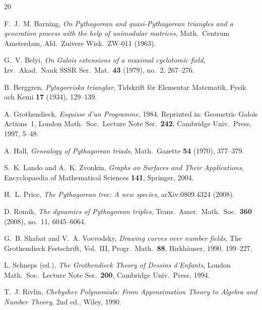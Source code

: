 \documentclass[12pt]{amsart}
\theoremstyle{definition}
\theoremstyle{remark}
\begin{document}
\begin{thebibliography}{20}

F.~J.~M. Barning,
\emph{On Pythagorean and quasi-Pythagorean triangles and a generation
process with the help of unimodular matrices},
Math.\ Centrum Amsterdam, Afd.\ Zuivere Wisk.\ ZW-011 (1963).

G.~V. Belyi,
\emph{On Galois extensions of a maximal cyclotomic field},
Izv.\ Akad.\ Nauk SSSR Ser.\ Mat.\ \textbf{43} (1979), no.~2, 267--276.

B. Berggren,
\emph{Pytagoreiska trianglar},
Tidskrift f\"or Elementar Matematik, Fysik och Kemi \textbf{17} (1934),
129--139.

A. Grothendieck,
\emph{Esquisse d'un Programme},
1984.  Reprinted in: Geometric Galois Actions~1,
London Math.\ Soc.\ Lecture Note Ser.\ \textbf{242},
Cambridge Univ.\ Press, 1997, 5--48.

A. Hall,
\emph{Genealogy of Pythagorean triads},
Math.\ Gazette \textbf{54} (1970), 377--379.

S.~K. Lando and A.~K. Zvonkin,
\emph{Graphs on Surfaces and Their Applications},
Encyclopaedia of Mathematical Sciences \textbf{141},
Springer, 2004.

H.~L. Price,
\emph{The Pythagorean tree: A new species},
arXiv:0809.4324 (2008).

D. Romik,
\emph{The dynamics of Pythagorean triples},
Trans.\ Amer.\ Math.\ Soc.\ \textbf{360} (2008), no.~11, 6045--6064.

G.~B. Shabat and V.~A. Voevodsky,
\emph{Drawing curves over number fields},
The Grothendieck Festschrift, Vol.~III, Progr.\ Math.\ \textbf{88},
Birkh\"auser, 1990, 199--227.

L. Schneps (ed.),
\emph{The Grothendieck Theory of Dessins d'Enfants},
London Math.\ Soc.\ Lecture Note Ser.\ \textbf{200},
Cambridge Univ.\ Press, 1994.

T.~J. Rivlin,
\emph{Chebyshev Polynomials: From Approximation Theory to Algebra and
Number Theory}, 2nd ed., Wiley, 1990.

\end{thebibliography}
\end{document}
